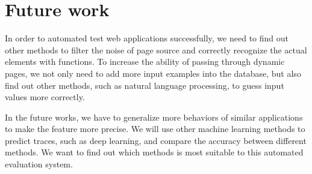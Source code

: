 \section{Future work}

In order to automated test web applications successfully,
we need to find out other methods to filter the noise of page source
and correctly recognize the actual elements with functions.
To increase the ability of passing through dynamic pages,
we not only need to add more input examples into the database,
but also find out other methods, such as natural language processing, to guess input values more correctly.

In the future works, we have to generalize more behaviors of similar applications to make the feature more precise.
We will use other machine learning methods to predict traces, such as deep learning,
and compare the accuracy between different methods.
We want to find out which methods is most suitable to this automated evaluation system.


